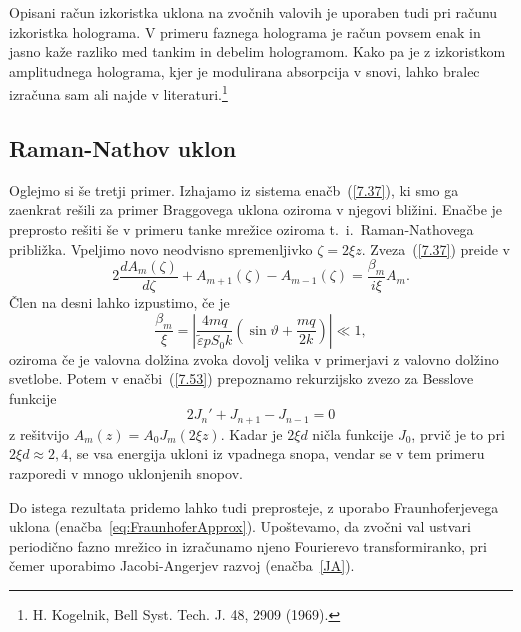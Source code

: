 \begin{remark}
Opisani račun izkoristka uklona na zvočnih valovih je uporaben tudi
pri računu izkoristka holograma. V primeru faznega holograma je račun
povsem enak in jasno kaže razliko med tankim in debelim hologramom.
Kako pa je z izkoristkom amplitudnega holograma, kjer je modulirana
absorpcija v snovi, lahko bralec izračuna sam ali najde v literaturi.\footnote{H.
Kogelnik, Bell Syst. Tech. J. 48, 2909 (1969).}
\end{remark}

\subsection*{Raman-Nathov uklon}
Oglejmo si še tretji primer. Izhajamo iz sistema enačb~(\ref{7.37}), ki smo ga 
zaenkrat rešili za primer Braggovega uklona oziroma v njegovi bližini. 
Enačbe je preprosto rešiti še v primeru tanke mrežice oziroma t.\ i.\ Raman-Nathovega približka. 
Vpeljimo novo neodvisno spremenljivko $\zeta=2\xi z$. 
Zveza~(\ref{7.37})
preide v 
\begin{equation}
2\frac{dA_{m}(\zeta)}{d\zeta}+A_{m+1}(\zeta)-A_{m-1}(\zeta)=\frac{\beta_{m}}{i\xi}A_{m}.
\label{7.53}
\end{equation}
 Člen na desni lahko izpustimo, če je 
\begin{equation}
\frac{\beta_{m}}{\xi}=\left| \frac{4mq}{\tilde{\varepsilon}pS_0k}(\sin\vartheta+\frac{mq}{2k})\right| 
\ll 1,
\label{7.54}
\end{equation}
oziroma če je valovna dolžina zvoka dovolj velika v primerjavi z valovno dolžino svetlobe. Potem 
v enačbi~(\ref{7.53}) prepoznamo rekurzijsko zvezo za Besslove funkcije 
\begin{equation}
2J_{n}'+J_{n+1}-J_{n-1}=0
\label{7.55}
\end{equation}
z rešitvijo $A_{m}(z)=A_{0}J_{m}(2\xi z)$. Kadar je $2\xi d$ ničla funkcije
$J_{0}$, prvič je to pri $2\xi d\approx 2,4$, se vsa energija ukloni iz
vpadnega snopa, vendar se v tem primeru 
razporedi v mnogo uklonjenih snopov.
\begin{remark}
Do istega rezultata pridemo lahko tudi preprosteje, z uporabo Fraunhoferjevega uklona
(enačba~\ref{eq:FraunhoferApprox}). Upoštevamo, da zvočni val ustvari periodično fazno 
mrežico in izračunamo njeno Fourierevo transformiranko, pri čemer uporabimo 
Jacobi-Angerjev razvoj (enačba~\ref{JA}). 
\end{remark}

